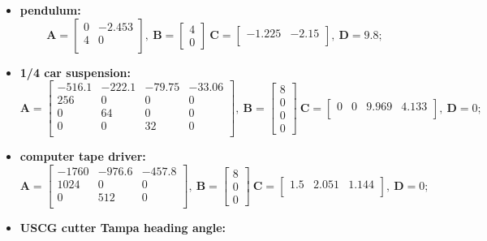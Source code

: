 \documentclass[runningheads,a4paper]{llncs}
\begin{document}
\begin{itemize}
{$$$$
}
\item{\textbf{pendulum:} 
$$
\textbf{A}=\left[\begin{array}{cc}
0		& -2.453	\\
4		& 0			\\	
\end{array}\right],~ \textbf{B} = \left[\begin{array}{c}
4 \\ 0
\end{array}\right]~
\textbf{C}=\left[\begin{array}{cc}
-1.225	& -2.15 	\\
\end{array}\right],~ \textbf{D}= 9.8;
$$
}
\item{\textbf{1/4 car suspension:} 
$$
\textbf{A}=\left[\begin{array}{cccc}
-516.1	& -222.1& -79.75& -33.06	\\
256		& 0		& 0		& 0			\\
0		& 64 	& 0		& 0 \\
0		& 0		& 32 	& 0 \\	
\end{array}\right],~ \textbf{B} = \left[\begin{array}{c}
8 \\ 0 \\ 0 \\ 0
\end{array}\right]~
\textbf{C}=\left[\begin{array}{cccc}
0	& 0	& 9.969 & 4.133 \\
\end{array}\right],~ \textbf{D}= 0;
$$
}
\item{\textbf{computer tape driver:} 
$$
\textbf{A}=\left[\begin{array}{ccc}
-1760		& -976.6	& -457.8	\\
1024		& 0			& 0			\\
0			& 512 		& 0			\\	
\end{array}\right],~ \textbf{B} = \left[\begin{array}{c}
8 \\ 0 \\ 0
\end{array}\right]~
\textbf{C}=\left[\begin{array}{ccc}
1.5	& 2.051	& 1.144 \\
\end{array}\right],~ \textbf{D}= 0;
$$
}
\item{\textbf{USCG cutter Tampa heading angle:} 
}
\end{itemize}
\end{document}

